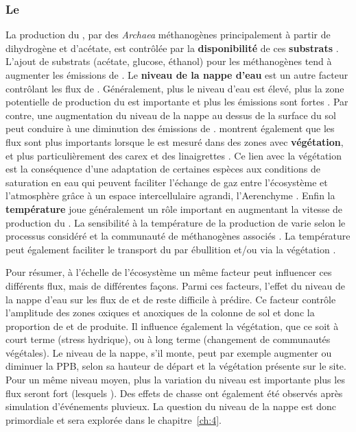 \subsubsection{Le \chh}

La production du \chh, par des \textit{Archaea} méthanogènes principalement à partir de dihydrogène et d'acétate, est contrôlée par la \textbf{disponibilité} de ces \textbf{substrats} \citep{segers1998}.
L'ajout de substrats (acétate, glucose, éthanol) pour les méthanogènes tend à augmenter les émissions de \chh \citep{coles2002}.
Le \textbf{niveau de la nappe d'eau} est un autre facteur contrôlant les flux de \chh.
Généralement, plus le niveau d'eau est élevé, plus la zone potentielle de production du \chh est importante et plus les émissions sont fortes \citep{pelletier2007}.
Par contre, une augmentation du niveau de la nappe au dessus de la surface du sol peut conduire à une diminution des émissions de \chh \citep{bubier1995}.
\citet{pelletier2007} montrent également que les flux sont plus importants lorsque le \chh est mesuré dans des zones avec \textbf{végétation}, et plus particulièrement des carex et des linaigrettes \citep{gogo2011}.
Ce lien avec la végétation est la conséquence d'une adaptation de certaines espèces aux conditions de saturation en eau qui peuvent faciliter l'échange de gaz entre l'écosystème et l'atmosphère grâce à un espace intercellulaire agrandi, l'Aerenchyme \citep{rydin2013d}.
Enfin la \textbf{température} joue généralement un rôle important en augmentant la vitesse de production du \chh.
La sensibilité à la température de la production de \chh varie selon le processus considéré et la communauté de méthanogènes associés \citep{segers1998}.
La température peut également faciliter le transport du \chh par ébullition et/ou via la végétation \citep{lai2009}.

Pour résumer, à l'échelle de l'écosystème un même facteur peut influencer ces différents flux, mais de différentes façons.
Parmi ces facteurs, l'effet du niveau de la nappe d'eau sur les flux de \coo et de \chh reste difficile à prédire.
Ce facteur contrôle l'amplitude des zones oxiques et anoxiques de la colonne de sol et donc la proportion de \coo et de \chh produite.
Il influence également la végétation, que ce soit à court terme (stress hydrique), ou à long terme (changement de communautés végétales).
Le niveau de la nappe, s'il monte, peut par exemple augmenter ou diminuer la PPB, selon sa hauteur de départ et la végétation présente sur le site.
Pour un même niveau moyen, plus la variation du niveau est importante plus les flux seront fort (lesquels \plop).
Des effets de chasse ont également été observés après simulation d’événements pluvieux.
La question du niveau de la nappe est donc primordiale et sera explorée dans le chapitre~\ref{ch:4}.


